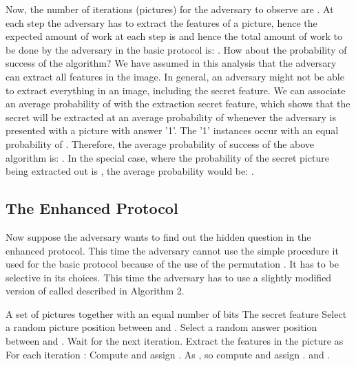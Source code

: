 \documentclass{llncs}
\begin{document}
Now, the number of iterations (pictures) for the adversary to observe are . At each step the adversary has to extract the features of a picture, hence the expected amount of work at each step is 
 and hence the total amount of work to be done by the adversary in the basic protocol is: . How about the probability of success of the algorithm? We have assumed in this analysis that the adversary can extract all features in the image. In general, an adversary might not be able to extract everything in an image, including the secret feature. We can associate an average probability of  with the extraction secret feature, which shows that the secret will be extracted at an average probability of  whenever the adversary is presented with a picture with answer '1'. The '1' instances occur with an equal probability of . Therefore, the average probability of success of the above algorithm is: . In the special case, where the probability of the secret picture being extracted out is , the average probability would be: .

\subsection{The Enhanced Protocol}
Now suppose the adversary  wants to find out the hidden question in the enhanced protocol. This time the adversary cannot use the simple procedure  it used for the basic protocol because of the use of the permutation . It has to be selective in its choices. This time the adversary has to use a slightly modified version of  called  described in Algorithm 2. 



\begin{algorithm}[h!]
\caption{}\label{alg:facty}
\begin{algorithmic}[1]
\REQUIRE A  set of pictures  together with an equal number of bits 
\ENSURE The secret feature 
\medskip
\STATE Select a random picture position  between  and .
\STATE Select a random answer position  between  and .
	\STATE Wait for the next iteration.
\ELSE 
	\STATE Extract the features in the picture as 
	\REPEAT
		\STATE For each iteration :
		\IF{}
			 \STATE Compute  and assign .
		\ELSE
			 \STATE As , so compute  and assign . 
		\ENDIF
	\UNTIL  and .
\ENDIF
\end{algorithmic}
\end{algorithm}
\end{document}

